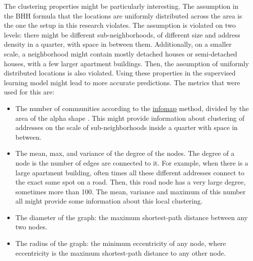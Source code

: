 The clustering properties might be particularly interesting.
The assumption in the BHH formula that the locations are uniformly distributed across the area is the one the setup in this research violates.
The assumption is violated on two levels: there might be different sub-neighborhoods, of different size and address density in a quarter, with space in between
them.
Additionally, on a smaller scale, a neighborhood might contain mostly detached houses or semi-detached houses, with a few larger apartment buildings.
Then, the assumption of uniformly distributed locations is also violated.
Using these properties in the supervised learning model might lead to more accurate predictions. The metrics that were used for this are:
\begin{itemize}
	\item The number of communities according to the \url{infomap} method, divided by the area of the alpha shape \citep{rosvall2008maps}.
	      This might provide information about clustering of addresses on the scale of sub-neighborhoods inside a quarter with space in between.
	\item The mean, max, and variance of the degree of the nodes. The degree of a node is the number of edges are connected to it.
	      For example, when there is a large apartment building, often times all these different addresses connect to the exact same spot on a road.
	      Then, this road node has a very large degree, sometimes more than 100. The mean, variance and maximum of this number all might provide some information
	      about this local clustering.
	\item The diameter of the graph: the maximum shortest-path distance between any two nodes.
	\item The radius of the graph: the minimum eccentricity of any node, where eccentricity is the maximum shortest-path distance to any other node.
\end{itemize}
